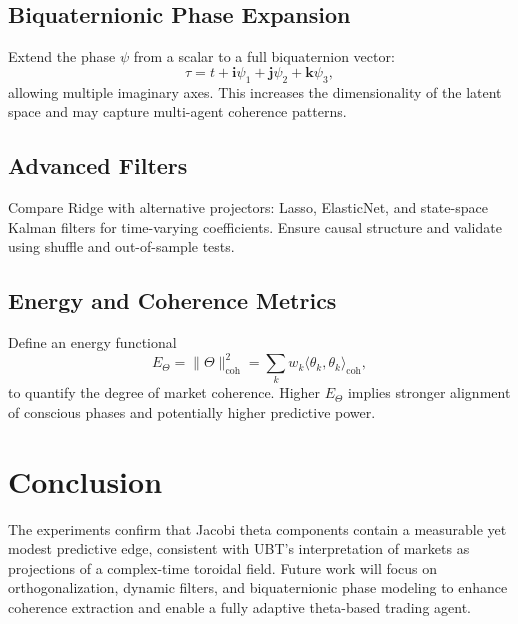 \documentclass[12pt]{article}
\begin{document}
\subsection*{Biquaternionic Phase Expansion}
Extend the phase $\psi$ from a scalar to a full biquaternion vector:
\[
\tau = t + \mathbf{i}\psi_1 + \mathbf{j}\psi_2 + \mathbf{k}\psi_3,
\]
allowing multiple imaginary axes.
This increases the dimensionality of the latent space and may capture
multi-agent coherence patterns.

\subsection*{Advanced Filters}
Compare Ridge with alternative projectors:
Lasso, ElasticNet, and state-space Kalman filters for time-varying coefficients.
Ensure causal structure and validate using shuffle and out-of-sample tests.

\subsection*{Energy and Coherence Metrics}
Define an energy functional
\[
E_\Theta = \|\Theta\|^2_{\text{coh}} =
\sum_k w_k \langle \theta_k, \theta_k \rangle_{\text{coh}},
\]
to quantify the degree of market coherence.  
Higher $E_\Theta$ implies stronger alignment of conscious phases
and potentially higher predictive power.

\section{Conclusion}
The experiments confirm that Jacobi theta components contain
a measurable yet modest predictive edge, consistent with UBT’s
interpretation of markets as projections of a complex-time toroidal field.
Future work will focus on orthogonalization, dynamic filters, and
biquaternionic phase modeling to enhance coherence extraction
and enable a fully adaptive theta-based trading agent.
\end{document}
